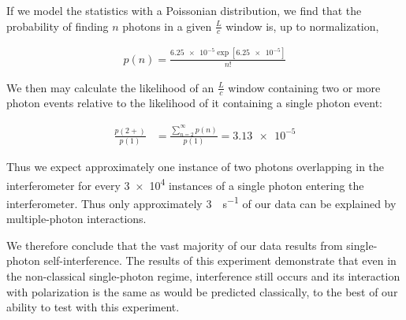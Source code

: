 \documentclass[letter]{article}
\begin{document}
\newpage
If we model the statistics with a Poissonian distribution, we find that the probability of finding $n$ photons in a given $\frac{L}{c}$ window is, up to normalization,

\begin{align}
p(n) = \frac{\num{6.25e-5} \exp[\num{6.25e-5}]}{n!}
\end{align}

We then may calculate the likelihood of an $\frac{L}{c}$ window containing two or more photon events relative to the likelihood of it containing a single photon event:

\begin{align}
\frac{p(2+)}{p(1)}
&=
\frac{\sum_{n=2}^\infty p(n) }{p(1)}
= \num{3.13e-5}
\end{align}

Thus we expect approximately one instance of two photons overlapping in the interferometer for every \num{3e4} instances of a single photon entering the interferometer. Thus only approximately \qty{3}{\count\per\s} of our data can be explained by multiple-photon interactions.

We therefore conclude that the vast majority of our data results from single-photon self-interference. The results of this experiment demonstrate that even in the non-classical single-photon regime, interference still occurs and its interaction with polarization is the same as would be predicted classically, to the best of our ability to test with this experiment.
\end{document}
